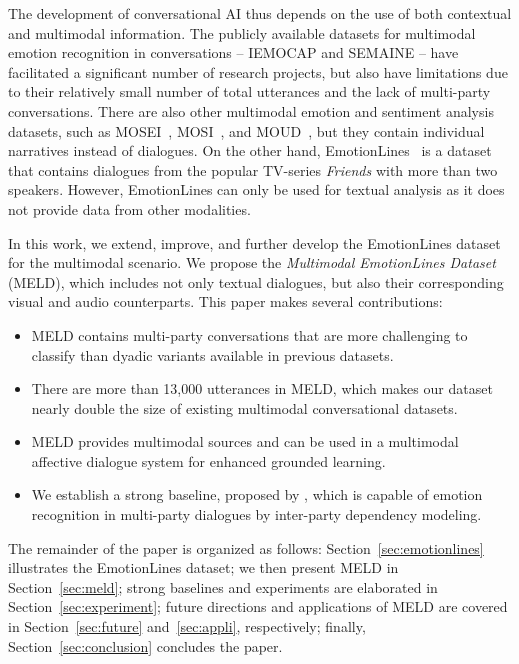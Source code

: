 \documentclass[11pt,a4paper]{article}
\begin{document}
The development of conversational AI thus depends on the use of both contextual and multimodal information. The publicly available datasets for multimodal emotion recognition in conversations -- IEMOCAP and SEMAINE -- have facilitated a significant number of research projects, but also have limitations due to their relatively small number of total utterances and the  lack of multi-party conversations. There are also other multimodal emotion and sentiment analysis datasets, such as MOSEI~\cite{zadeh2018multimodal}, MOSI~\cite{zadeh2016multimodal}, and MOUD~\cite{perez2013utterance}, but they contain individual narratives instead of dialogues. On the other hand, EmotionLines~\citep{chen2018emotionlines} is a dataset that contains dialogues from the popular TV-series \textit{Friends} with more than two speakers. However, EmotionLines can only be used for textual analysis as it does not provide data from other modalities.

In this work, we extend, improve, and further develop the EmotionLines dataset for the multimodal scenario. We propose the \textit{Multimodal EmotionLines Dataset} (MELD), which  includes not only textual dialogues, but also their corresponding visual and audio counterparts. This paper makes several contributions:
\begin{itemize}[leftmargin=*]
\itemsep0em 
\item MELD contains multi-party conversations that are more challenging to classify than dyadic variants available in previous datasets. \item There are more than 13,000 utterances in MELD, which makes our dataset nearly double the size of  existing multimodal conversational datasets.
\item MELD provides multimodal sources and can be used in a multimodal affective dialogue system for enhanced grounded learning.
\item We establish a strong baseline, proposed by \citet{majumder2018dialoguernn}, which is capable of emotion recognition in multi-party dialogues by inter-party dependency modeling.
\end{itemize}

The remainder of the paper is organized as follows: Section~\ref{sec:emotionlines} illustrates the EmotionLines dataset; we then present MELD in Section~\ref{sec:meld}; strong baselines and experiments are elaborated in Section~\ref{sec:experiment}; future directions and applications of MELD are covered in Section~\ref{sec:future} and~\ref{sec:appli}, respectively; finally, Section~\ref{sec:conclusion} concludes the paper.
\end{document}
